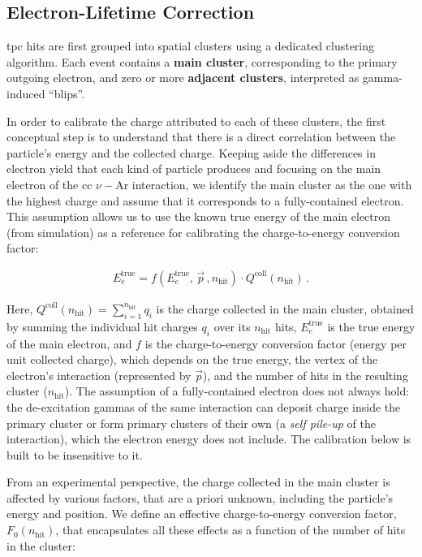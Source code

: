 \subsection{Electron-Lifetime Correction}\label{sec:ELECTRON_LIFETIME}
\gls{tpc} hits are first grouped into spatial clusters using a dedicated clustering algorithm. Each event contains a \textbf{main cluster}, corresponding to the primary outgoing electron, and zero or more \textbf{adjacent clusters}, interpreted as gamma-induced ``blips''. 

In order to calibrate the charge attributed to each of these clusters, the first conceptual step is to understand that there is a direct correlation between the particle's energy and the collected charge. Keeping aside the differences in electron yield that each kind of particle produces and focusing on the main electron of the \gls{cc} $\nu-\text{Ar}$ interaction, we identify the main cluster as the one with the highest charge and assume that it corresponds to a fully-contained electron. This assumption allows us to use the known true energy of the main electron (from simulation) as a reference for calibrating the charge-to-energy conversion factor:

\begin{align}
    E^{\text{true}}_e = f\left(E^{\text{true}}_e,\,\overrightarrow{p}\,,n_\text{hit}\right) \cdot Q^{\text{coll}}(n_\text{hit})\,.
\end{align}

Here, \( Q^{\text{coll}}(n_\text{hit}) = \sum_{i=1}^{n_\text{hit}} q_i \) is the charge collected in the main cluster, obtained by summing the individual hit charges \( q_i \) over its \( n_\text{hit} \) hits, \( E^{\text{true}}_e \) is the true energy of the main electron, and \( f \) is the charge-to-energy conversion factor (energy per unit collected charge), which depends on the true energy, the vertex of the electron's interaction (represented by \( \overrightarrow{p} \)), and the number of hits in the resulting cluster (\( n_\text{hit} \)). The assumption of a fully-contained electron does not always hold: the de-excitation gammas of the same interaction can deposit charge inside the primary cluster or form primary clusters of their own (a \emph{self pile-up} of the interaction), which the electron energy does not include. The calibration below is built to be insensitive to it.

From an experimental perspective, the charge collected in the main cluster is affected by various factors, that are a priori unknown, including the particle's energy and position. We define an effective charge-to-energy conversion factor, \( F_0(n_\text{hit})\), that encapsulates all these effects as a function of the number of hits in the cluster:

